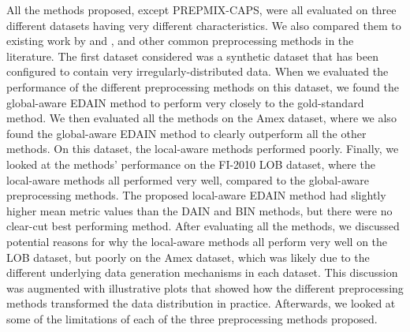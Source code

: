 \documentclass{statsmsc}
\begin{document}
{%
All the methods proposed, except \ac{PREPMIX-CAPS}, were all evaluated on three different
datasets having very different characteristics. We also compared them to existing work by
\cite{dain} and \cite{bin}, and other common preprocessing methods in the literature.
The first dataset considered  was a synthetic dataset
that has been configured to contain very irregularly-distributed data. 
When we evaluated the performance of the different preprocessing methods on this dataset, we found
the global-aware \ac{EDAIN} method to perform very closely to the gold-standard method.
We then evaluated all the methods on the Amex dataset, where we also found the
global-aware \ac{EDAIN} method to clearly outperform all the other methods. On
this dataset, the local-aware methods performed poorly. Finally, we looked at
the methods' performance on the FI-2010 \ac{LOB} dataset, where the local-aware
methods all performed very well, compared to the global-aware preprocessing
methods. The proposed local-aware \ac{EDAIN} method had slightly higher mean metric values
than the \ac{DAIN} and \ac{BIN} methods, but there were no clear-cut best performing method.
After evaluating all the methods, we discussed potential reasons for why the local-aware methods
all perform very well on the \ac{LOB} dataset, but poorly on the Amex dataset,
which was likely due to the different underlying data generation mechanisms in each dataset.
This discussion was augmented with illustrative plots that showed how the different
preprocessing methods transformed the data distribution in practice.
Afterwards, we looked at some of the limitations of each of the three preprocessing
methods proposed.

}
\end{document}
